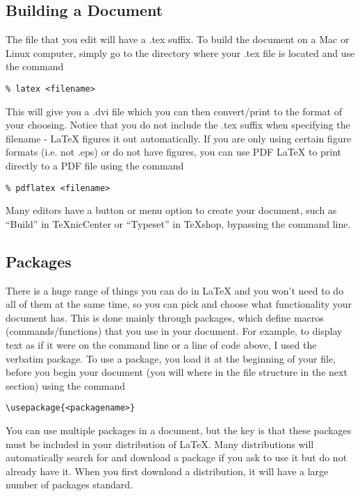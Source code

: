 \documentclass[12pt]{article}
\begin{document}
\subsection{Building a Document}
The file that you edit will have a .tex suffix. To build the document on a Mac or Linux computer, simply go to the directory where your .tex file is located and use the command

\begin{verbatim}
% latex <filename>
\end{verbatim}
This will give you a .dvi file which you can then convert/print to the format of your choosing. Notice that you do not include the .tex suffix when specifying the filename - LaTeX figures it out automatically. If you are only using certain figure formats (i.e. not .eps) or do not have figures, you can use PDF LaTeX to print directly to a PDF file using the command 

\begin{verbatim}
% pdflatex <filename>
\end{verbatim}
Many editors have a button or menu option to create your document, such as ``Build'' in TeXnicCenter or ``Typeset'' in TeXshop, bypassing the command line.
 
\subsection{Packages}
There is a huge range of things you can do in LaTeX and you won't need to do all of them at the same time, so you can pick and choose what functionality your document has. This is done mainly through packages, which define macros (commands/functions) that you use in your document. For example, to display text as if it were on the command line or a line of code above, I used the verbatim package. To use a package, you load it at the beginning of your file, before you begin your document (you will where in the file structure in the next section) using the command

\begin{verbatim}
\usepackage{<packagename>}
\end{verbatim}
You can use multiple packages in a document, but the key is that these packages must be included in your distribution of LaTeX. Many distributions will automatically search for and download a package if you ask to use it but do not already have it. When you first download a distribution, it will have a large number of packages standard.
\end{document}
